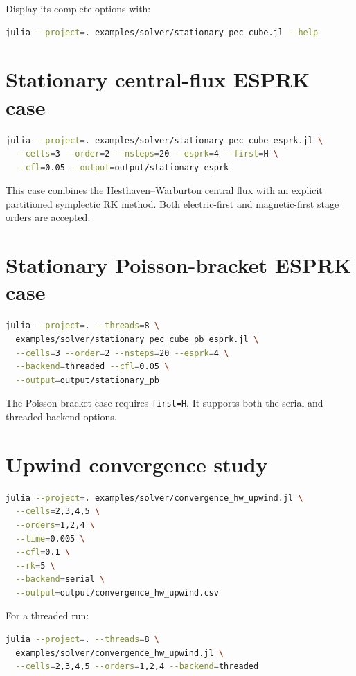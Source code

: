 \documentclass[11pt,oneside]{book}
\newcommand{\code}[1]{\texttt{#1}}
\begin{document}
Display its complete options with:

\begin{lstlisting}[language=bash]
julia --project=. examples/solver/stationary_pec_cube.jl --help
\end{lstlisting}

\section{Stationary central-flux ESPRK case}

\begin{lstlisting}[language=bash]
julia --project=. examples/solver/stationary_pec_cube_esprk.jl \
  --cells=3 --order=2 --nsteps=20 --esprk=4 --first=H \
  --cfl=0.05 --output=output/stationary_esprk
\end{lstlisting}

This case combines the Hesthaven--Warburton central flux with an explicit
partitioned symplectic RK method. Both electric-first and magnetic-first stage
orders are accepted.

\section{Stationary Poisson-bracket ESPRK case}

\begin{lstlisting}[language=bash]
julia --project=. --threads=8 \
  examples/solver/stationary_pec_cube_pb_esprk.jl \
  --cells=3 --order=2 --nsteps=20 --esprk=4 \
  --backend=threaded --cfl=0.05 \
  --output=output/stationary_pb
\end{lstlisting}

The Poisson-bracket case requires \code{first=H}. It supports both the serial
and threaded backend options.

\section{Upwind convergence study}

\begin{lstlisting}[language=bash]
julia --project=. examples/solver/convergence_hw_upwind.jl \
  --cells=2,3,4,5 \
  --orders=1,2,4 \
  --time=0.005 \
  --cfl=0.1 \
  --rk=5 \
  --backend=serial \
  --output=output/convergence_hw_upwind.csv
\end{lstlisting}

For a threaded run:

\begin{lstlisting}[language=bash]
julia --project=. --threads=8 \
  examples/solver/convergence_hw_upwind.jl \
  --cells=2,3,4,5 --orders=1,2,4 --backend=threaded
\end{lstlisting}
\end{document}
